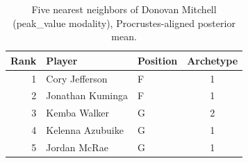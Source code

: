 \begin{table}[htbp]
  \centering\small
  \begin{tabular}{rllc}
    \toprule
    Rank & Player & Position & Archetype \\
    \midrule
    1 & Cory Jefferson & F & 1 \\
    2 & Jonathan Kuminga & F & 1 \\
    3 & Kemba Walker & G & 2 \\
    4 & Kelenna Azubuike & G & 1 \\
    5 & Jordan McRae & G & 1 \\
    \bottomrule
  \end{tabular}
  \caption{Five nearest neighbors of Donovan Mitchell (peak_value modality), Procrustes-aligned posterior mean.}
  \label{tab:Donovan_Mitchell_neighbors_peak_value}
\end{table}

